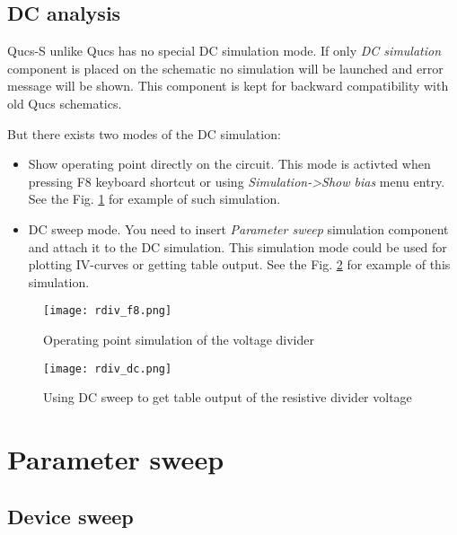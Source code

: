 \subsection{DC analysis} \label{sec:dc}

Qucs-S unlike Qucs has no special DC simulation mode. If only \emph{DC
simulation} component is placed on the schematic no simulation will be launched
and error message will be shown. This component is kept for backward
compatibility with old Qucs schematics.

But there exists two modes of the DC simulation:

\begin{itemize}
 \item Show operating point directly on the circuit. This mode is activted when
pressing F8 keyboard shortcut or using \emph{Simulation->Show bias} menu
entry. See the Fig. \ref{fig:rdiv_f8} for example of such simulation.
 \item DC sweep mode. You need to insert \emph{Parameter sweep} simulation
component and attach it to the DC simulation. This simulation mode could be
used for plotting IV-curves or getting table output. See the Fig.
\ref{fig:rdiv_dc} for example of this simulation.
\end{itemize}


\begin{figure}[!ht]
    \begin{center}
        \texttt{[image: rdiv\_f8.png]}
    \end{center}
    \caption{Operating point simulation of the voltage divider}
\label{fig:rdiv_f8}
\end{figure}


\begin{figure}[!ht]
    \begin{center}
        \texttt{[image: rdiv\_dc.png]}
    \end{center}
    \caption{Using DC sweep to get table output of the resistive divider
voltage}
\label{fig:rdiv_dc}
\end{figure}

\section{Parameter sweep}

\subsection{Device sweep}

